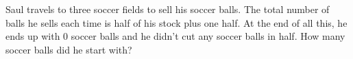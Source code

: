 Saul travels to three soccer fields to sell his soccer balls. The total number of balls he sells each time is half of his stock plus one half. At the end of all this, he ends up with 0 soccer balls and he didn't cut any soccer balls in half. How many soccer balls did he start with?
